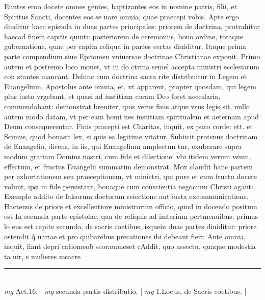 \documentclass{article}
\begin{document}
\begin{pages}
Euntes eroo docete omnes gentes, baptizantes eos in nomine patris, filii, et Spiritus Sancti, docentes eos se uare omnia, quae praecepi vobis. Apte ergo diuditur haec epistola in duas partes principales: priorem de doctrina, protrahitur haecad finem capitis quinti: posteriorem de ceremoniis, bono ordine, totaque  gubernatione, quae per capita reliqua in partes certas diuiditur. Itaque  prima parte compendium siue Epitomen vniuersae doctrinae Christianae exponit. Primo autem et postremo loco monet, vt in do ctrina semel accepta ministri ecclesiarum con stantes mancant. Dehinc cum doctrina sacra rite distribuitur in Legem et Euangelium, Apostolus ante omnia, et, vt apparent, propter quosdam, qui legem plus iusto vrgebant, et quasi ad iustitiam coram Deo foret neceslaria, commendabant: demonstrat breuiter, quis verus finis atque  vsus legis sit, nullo autem modo datam, vt per eam homi nes iustitiam spiritualem et aeternam apud Deum consequerentur. Finis pracepti est Charitas, inquit, ex puro corde: ett. et Scimus, quod bonasit lex, si quis ea legitime vitatur. Subiicit protsnus doctrinam de Euangelio, dicens, in iis, qui Euangelium amplectun tur, exuberare supra modum gratiam Domins nostri, cum fide et dilectione: vbi itidem verum vsum, effectum, et fructus Euangelii summatim demonstrat. Mox claudit hanc partem per exhortationem seu praeceptionem, vt ministri, qui pure et cum fructu docere volunt, ipsi in fide persistant, bonaque  cum conscientia negocium Christi agant: Exemplo addito de falsorum doctorum reiectione aut iusta excommunicatione.  \pend\pstart Hactenus de priore et excellentiore ministrorum officio, quod in docendo positum est In secunda parte epistolae, qua de reliquis ad imterium pertmenuibus: primus lo eus est capite secundo, de sacris coetibus, isquein duas partes diuiditur: priore ostendit q̃ uariae et pro quibarebus precationes ibi debeant fieri: Ante omnia, inquit, fiant depri catiomeob́ seorauoneset cAddit, quo assectu, quaque  modestia ta uir, s mulieres msacre  \pend
\vspace{0.5cm}\noindent
\vspace{0.2cm}\rule{1cm}{0.2pt}\\ 
\hspace{0.2cm}\textit{mg}
\footnotesize Act.16. 
\normalsize| 
\hspace{0.2cm}\textit{mg}
\footnotesize secunda partis distributio. 
\normalsize| 
\hspace{0.2cm}\textit{mg}
\footnotesize 1.Locus, de Sacris coetibus. 
\normalsize| 

\end{pages}
\end{document}
